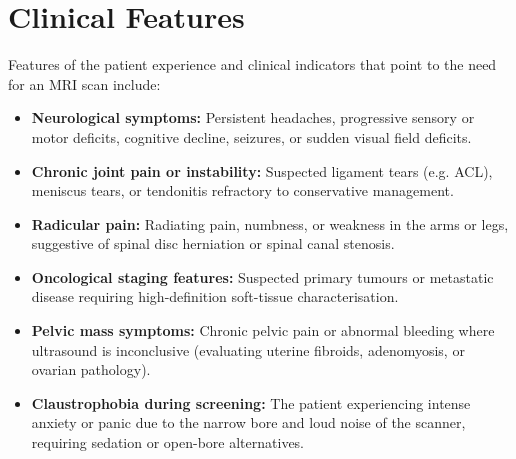 \section*{Clinical Features}
Features of the patient experience and clinical indicators that point to the need for an MRI scan include:
\begin{itemize}
    \item \textbf{Neurological symptoms:} Persistent headaches, progressive sensory or motor deficits, cognitive decline, seizures, or sudden visual field deficits.
    \item \textbf{Chronic joint pain or instability:} Suspected ligament tears (e.g. ACL), meniscus tears, or tendonitis refractory to conservative management.
    \item \textbf{Radicular pain:} Radiating pain, numbness, or weakness in the arms or legs, suggestive of spinal disc herniation or spinal canal stenosis.
    \item \textbf{Oncological staging features:} Suspected primary tumours or metastatic disease requiring high-definition soft-tissue characterisation.
    \item \textbf{Pelvic mass symptoms:} Chronic pelvic pain or abnormal bleeding where ultrasound is inconclusive (evaluating uterine fibroids, adenomyosis, or ovarian pathology).
    \item \textbf{Claustrophobia during screening:} The patient experiencing intense anxiety or panic due to the narrow bore and loud noise of the scanner, requiring sedation or open-bore alternatives.
\end{itemize}

